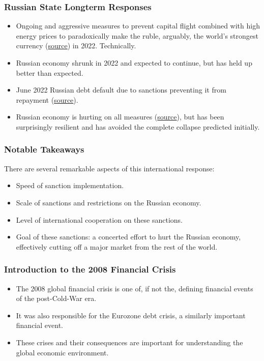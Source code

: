 \documentclass[handout]{beamer}
\begin{document}
\begin{frame} 
	\frametitle{\LARGE{Russian State Longterm Responses}}
	\begin{itemize}
		\item Ongoing and aggressive measures to prevent capital flight combined with high energy prices to paradoxically make the ruble, arguably, the world's strongest currency (\href{https://www.cbsnews.com/news/russia-ukraine-ruble-currency-russian-economy-sanctioms-2022/}{source}) in 2022. Technically. \pause
		\item Russian economy shrunk in 2022 and expected to continue, but has held up better than expected. \pause
		\item June 2022 Russian debt default due to sanctions preventing it from repayment (\href{https://www.cbsnews.com/news/russia-default-on-debt/}{source}). \pause
		\item Russian economy is hurting on all measures (\href{https://www.bbc.com/news/world-europe-60125659}{source}), but has been surprisingly resilient and has avoided the complete collapse predicted initially.
	\end{itemize}
	
\end{frame}

\begin{frame} 
	\frametitle{\LARGE{Notable Takeaways}}
	There are several remarkable aspects of this international response:
	\begin{itemize}
		\item Speed of sanction implementation. \pause
		\item Scale of sanctions and restrictions on the Russian economy. \pause
		\item Level of international cooperation on these sanctions. \pause
		\item Goal of these sanctions: a concerted effort to hurt the Russian economy, effectively cutting off a major market from the rest of the world.	
	\end{itemize}
\end{frame}

\begin{frame} 
	\frametitle{\LARGE{Introduction to the 2008 Financial Crisis}}
	\begin{itemize}
		\item The 2008 global financial crisis is one of, if not the, defining financial events of the post-Cold-War era. \pause
		\item It was also responsible for the Eurozone debt crisis, a similarly important financial event. \pause
		\item These crises and their consequences are important for understanding the global economic environment. 
	\end{itemize}
\end{frame}
\end{document}
